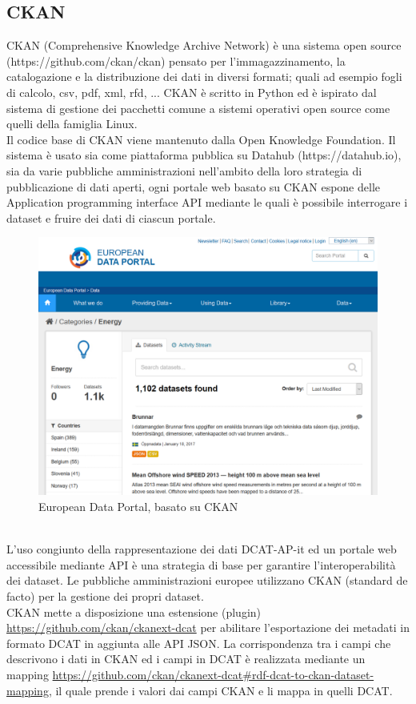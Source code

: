 \documentclass{article}
\theoremstyle{plain}
\theoremstyle{definition}
\begin{document}
\subsection{CKAN}
CKAN (Comprehensive Knowledge Archive Network) è una sistema open source (https://github.com/ckan/ckan) pensato per l'immagazzinamento, la catalogazione e la distribuzione dei dati in diversi formati; quali ad esempio fogli di calcolo, csv, pdf, xml, rfd, ... CKAN è scritto in Python ed è ispirato dal sistema di gestione dei pacchetti comune a sistemi operativi open source come quelli della famiglia Linux.
\\
Il codice base di CKAN viene mantenuto dalla Open Knowledge Foundation. Il sistema è usato sia come piattaforma pubblica su Datahub (https://datahub.io), sia da varie pubbliche amministrazioni nell'ambito della loro strategia di pubblicazione di dati aperti, ogni portale web basato su CKAN espone delle Application programming interface API mediante le quali è possibile interrogare i dataset e fruire dei dati di ciascun portale. 
\\
\begin{figure}[htbp]
\begin{center}
\includegraphics[scale=0.50]{img/ckanedp.png}
\caption{European Data Portal, basato su CKAN}
\end{center}
\end{figure}
\\
L'uso congiunto della rappresentazione dei dati DCAT-AP-it ed un portale web accessibile mediante API  è una strategia di base per garantire l'interoperabilità dei dataset. Le pubbliche amministrazioni europee utilizzano CKAN (standard de facto) per la gestione dei propri dataset.
\\
CKAN mette a disposizione una estensione (plugin) \url{https://github.com/ckan/ckanext-dcat} per abilitare l'esportazione dei metadati in formato DCAT in aggiunta alle API JSON. La corrispondenza tra i campi che descrivono i dati in CKAN ed i campi in DCAT è realizzata mediante un mapping \url{https://github.com/ckan/ckanext-dcat#rdf-dcat-to-ckan-dataset-mapping}, il quale prende i valori dai campi CKAN e li mappa in quelli DCAT.
\end{document}
